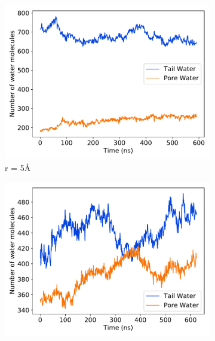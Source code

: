\documentclass{article}
\begin{document}
  \begin{figure}[!htb]
  \centering
  \begin{subfigure}{0.45\textwidth}
  \includegraphics[width=\linewidth]{r5_gap.pdf}
  \caption{r = 5\AA}\label{fig:r5_gap}
  \end{subfigure}
  \begin{subfigure}{0.45\textwidth}
  \includegraphics[width=\linewidth]{r6_gap.pdf}

\end{subfigure}
\end{figure}
\end{document}
